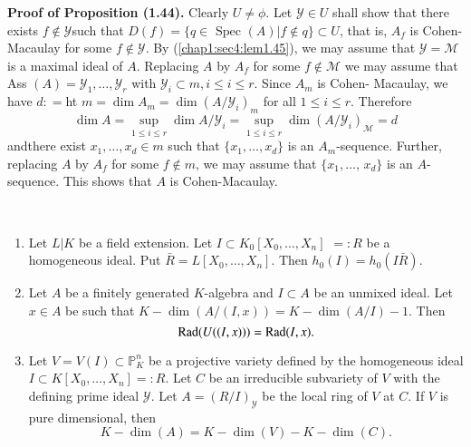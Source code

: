 \medskip
\noindent \textbf{Proof of Proposition (1.44). } 
Clearly $U \neq \phi $. Let $\mathscr{Y} \in U$ shall show that there
exists $ f \notin \mathscr{Y} $such that  
$D(f) = \{ q \in \text{ Spec } (A) | f \notin q \} \subset U$, that
is, $A_f$ is Cohen-Macaulay for some $f \notin \mathscr{Y} $. By
(\ref{chap1:sec4:lem1.45}), we may assume that $\mathscr{Y} = \mathscr{M}$ is a maximal
ideal of $A$. Replacing $A$ by $A_f$ for some $f \notin \mathscr{M}$
we may assume that Ass $(A) = \mathscr{Y}_1,  \ldots,  \mathscr{Y}_r $
with $\mathscr{Y}_i \subset m,  i \leq i \leq r$. Since $A_m$ is
Cohen- Macaulay, we have $d:  = $ht $m = \dim A_m = \dim (A/
\mathscr{Y}_i)_m$ for all $1 \leq i \leq r$. Therefore  
$$
\dim A = \sup_{1 \leq i \leq r} \dim A / \mathscr{Y}_i = \sup_{1 \leq
  i \leq r}  \dim (A/\mathscr{Y}_i)_\mathscr{M} = d 
$$
and\pageoriginale there exist $x_1, \ldots,  x_d \in m$ such that $\{ x_1, \ldots,
x_d\}$ is an $A_m $-sequence. Further, replacing $A$ by $A_f$ for some
$f \not\in m$,  we may assume that $\{ x_1, \ldots$, $x_d\}$ is an
$A$-sequence. This shows that $A$ is Cohen-Macaulay. 

\setcounter{proposition}{45}
\begin{proposition}\label{chap1:sec4:prop1.46}~

  \begin{enumerate}[\rm 1.]
  \item Let $L|K$ be a field extension. Let $I \subset K_0
    [X_0, \ldots,  X_n]$ $=:R$ be a homogeneous ideal. Put
    $\bar{R}=L [X_0, \ldots,  X_n]$. Then $h_0 (I) = h_0 (I\bar{R})$. 
  \item Let $A$ be a finitely generated $K$-algebra and 
    $I \subset A$ be an unmixed ideal. Let $x \in A$
    be such that $K-\dim (A/ (I, x)) = K-\dim (A/I)-1$. Then 
    $$
    \operatorname{Rad}  (U((I, x))) = \operatorname{Rad}  (I, x).
    $$
  \item Let $V= V(I) \subset \mathbb{P}^n_K$ be a projective
    variety defined by the homogeneous ideal $I \subset K [X_0, \ldots,
      X_n] =:  R$. Let $C$ be an irreducible subvariety of $V$ with the
    defining prime ideal $\mathscr{Y}$. Let $A=(R/I)_\mathscr{Y}$ be the
    local ring of $V$ at $C$. If $V$ is pure dimensional, then 
    $$
    K-\dim (A) = K-\dim (V)-K-\dim(C).
    $$
  \end{enumerate}
\end{proposition}

